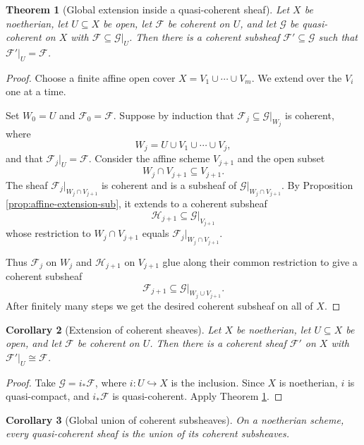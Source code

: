 \documentclass[11pt]{amsart}
\newcommand{\F}{\mathscr F}
\newcommand{\G}{\mathscr G}
\newcommand{\Hh}{\mathscr H}
\newcommand{\into}{\hookrightarrow}
\theoremstyle{plain}
\newtheorem{theorem}{Theorem}[section]
\newtheorem{corollary}[theorem]{Corollary}
\theoremstyle{definition}
\theoremstyle{remark}
\begin{document}
\begin{theorem}[Global extension inside a quasi-coherent sheaf]\label{thm:global-extension-sub}
Let $X$ be noetherian, let $U\subseteq X$ be open, let $\F$ be coherent on $U$, and let $\G$ be quasi-coherent on $X$ with $\F\subseteq \G|_U$.  Then there is a coherent subsheaf $\F'\subseteq \G$ such that $\F'|_U=\F$.
\end{theorem}

\begin{proof}
Choose a finite affine open cover $X=V_1\cup\cdots\cup V_m$.  We extend over the $V_i$ one at a time.

Set $W_0=U$ and $\F_0=\F$.  Suppose by induction that $\F_j\subseteq \G|_{W_j}$ is coherent, where
\[
  W_j = U\cup V_1\cup\cdots\cup V_j,
\]
and that $\F_j|_U=\F$.  Consider the affine scheme $V_{j+1}$ and the open subset
\[
  W_j\cap V_{j+1}\subseteq V_{j+1}.
\]
The sheaf $\F_j|_{W_j\cap V_{j+1}}$ is coherent and is a subsheaf of $\G|_{W_j\cap V_{j+1}}$.  By Proposition \ref{prop:affine-extension-sub}, it extends to a coherent subsheaf
\[
  \Hh_{j+1}\subseteq \G|_{V_{j+1}}
\]
whose restriction to $W_j\cap V_{j+1}$ equals $\F_j|_{W_j\cap V_{j+1}}$.

Thus $\F_j$ on $W_j$ and $\Hh_{j+1}$ on $V_{j+1}$ glue along their common restriction to give a coherent subsheaf
\[
  \F_{j+1}\subseteq \G|_{W_j\cup V_{j+1}}.
\]
After finitely many steps we get the desired coherent subsheaf on all of $X$.
\end{proof}

\begin{corollary}[Extension of coherent sheaves]\label{cor:extension-coherent}
Let $X$ be noetherian, let $U\subseteq X$ be open, and let $\F$ be coherent on $U$.  Then there is a coherent sheaf $\F'$ on $X$ with $\F'|_U\cong \F$.
\end{corollary}

\begin{proof}
Take $\G=i_*\F$, where $i:U\into X$ is the inclusion.  Since $X$ is noetherian, $i$ is quasi-compact, and $i_*\F$ is quasi-coherent.  Apply Theorem \ref{thm:global-extension-sub}.
\end{proof}

\begin{corollary}[Global union of coherent subsheaves]\label{cor:global-union}
On a noetherian scheme, every quasi-coherent sheaf is the union of its coherent subsheaves.
\end{corollary}
\end{document}
